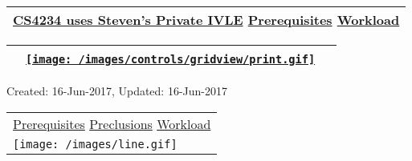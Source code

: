 \hypertarget{ctl00_ctl00_ContentPlaceHolder1_ContentPlaceHolder1_pnlReferences}{}
\begin{longtable}[]{@{}l@{}}
\toprule
\protect\hypertarget{ctl00_ctl00_ContentPlaceHolder1_ContentPlaceHolder1_lblSectionBottom}{}{\protect\hyperlink{CS4234ux5cux2520usesux5cux2520Steven}{CS4234
uses Steven's Private IVLE} \textbar{}
\protect\hyperlink{Prerequisites}{Prerequisites} \textbar{}
\protect\hyperlink{Workload}{Workload}}\tabularnewline
\bottomrule
\end{longtable}

\hypertarget{ctl00_ctl00_ContentPlaceHolder1_ContentPlaceHolder1_UP}{}
\hypertarget{contentstart}{}
\hypertarget{ctl00_ctl00_ContentPlaceHolder1_ContentPlaceHolder1_pnlMain}{}
\begin{longtable}[]{@{}ll@{}}
\toprule
&
{\href{javascript:PrintThisPage();}{\texttt{[image: /images/controls/gridview/print.gif]}}~~}\tabularnewline
\bottomrule
\end{longtable}

\protect\hypertarget{ctl00_ctl00_ContentPlaceHolder1_ContentPlaceHolder1_LV_UpdateInfo_ctrl0_txtDate}{}{Created:
16-Jun-2017, Updated: 16-Jun-2017}

\begin{longtable}[]{@{}l@{}}
\toprule
\protect\hypertarget{ctl00_ctl00_ContentPlaceHolder1_ContentPlaceHolder1_lblSectionTop}{}{\protect\hyperlink{Prerequisites}{Prerequisites}
\textbar{} \protect\hyperlink{Preclusions}{Preclusions} \textbar{}
\protect\hyperlink{Workload}{Workload}}\tabularnewline
\texttt{[image: /images/line.gif]}\tabularnewline
\bottomrule
\end{longtable}

